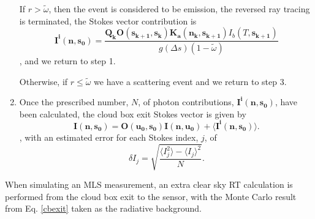 \begin{enumerate}
If $r>\tilde{\omega}$, then the event is considered to be emission,
the reversed ray tracing is terminated, the Stokes vector contribution is
\begin{equation}
\mathbf{I^i(n,s_0)}=\frac{\mathbf{Q_k O(s_{k+1},s_k)}
  \mathbf{K_a(n_k,s_{k+1})} I_b(T,\mathbf{s_{k+1}})}
  {g\left(\Delta s\right)\left(1-\tilde{\omega}\right)}
\label{Iemission3}
\end{equation}
, and we return to step 1.

Otherwise, if $r\le\tilde{\omega}$
we have a scattering event and we return to step 3.
\item
Once the prescribed number, $N$,  of photon contributions,
$\mathbf{I^i(n,s_0)}$, have been calculated, the cloud box exit Stokes
vector is given by
\begin{equation}
\mathbf{I(n,s_0)}=\mathbf{O(u_0,s_0)I(n,u_0)}+\langle\mathbf{I^i(n,s_0)}\rangle.
\label{cbexit}
\end{equation}
, with an estimated error for each Stokes index, $j$,  of
\begin{equation}
\delta I_j=\sqrt{\frac{\langle I_j^2\rangle-\langle I_j\rangle^2}{N}}.
\label{error}
\end{equation}
\end{enumerate}
When simulating an MLS measurement, an extra clear sky RT calculation
is performed from the cloud box exit to the sensor, with the Monte
Carlo result from Eq. \ref{cbexit} taken as the radiative background.

 \label{sec:montecarlo:implementation}

 \label{sec:montecarlo:plans}
 

